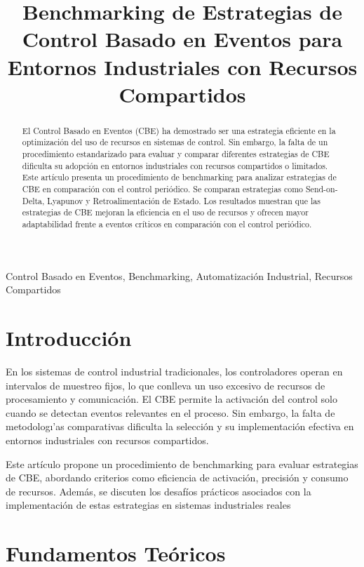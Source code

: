 \documentclass[conference]{IEEEtran}
\title{Benchmarking de Estrategias de Control Basado en Eventos para Entornos Industriales con Recursos Compartidos}
\author{\IEEEauthorblockN{Cristhian Joel Apaza Flores}
\IEEEauthorblockA{Facultad de Ingenier\'ia, Universidad Mayor de San Andr\'es\\
Email: cjapaza11@umsa.bo}}
\begin{document}
\maketitle

\begin{abstract}
El Control Basado en Eventos (CBE) ha demostrado ser una estrategia eficiente en la optimizaci\'on del uso de recursos en sistemas de control. Sin embargo, la falta de un procedimiento estandarizado para evaluar y comparar diferentes estrategias de CBE dificulta su adopci\'on en entornos industriales con recursos compartidos o limitados. Este art\'iculo presenta un procedimiento de benchmarking para analizar estrategias de CBE en comparaci\'on con el control peri\'odico. Se comparan estrategias como Send-on-Delta, Lyapunov y Retroalimentaci\'on de Estado. Los resultados muestran que las estrategias de CBE mejoran la eficiencia en el uso de recursos y ofrecen mayor adaptabilidad frente a eventos cr\'iticos en comparaci\'on con el control peri\'odico.
\end{abstract}

\begin{IEEEkeywords}
Control Basado en Eventos, Benchmarking, Automatizaci\'on Industrial, Recursos Compartidos
\end{IEEEkeywords}

\section{Introducción}
En los sistemas de control industrial tradicionales, los controladores operan en intervalos de muestreo fijos, lo que conlleva un uso excesivo de recursos de procesamiento y comunicaci\'on. El CBE permite la activaci\'on del control solo cuando se detectan eventos relevantes en el proceso\cite{Arzen1999, Astrom2008}. Sin embargo, la falta de metodolog\i'as comparativas dificulta la selecci\'on y su implementación efectiva en entornos industriales con recursos compartidos. 

Este artículo propone un procedimiento de benchmarking para evaluar estrategias de CBE, abordando criterios como eficiencia de activaci\'on, precisi\'on y consumo de recursos. Además, se discuten los desafíos prácticos asociados con la implementación de estas estrategias en sistemas industriales reales

\section{Fundamentos Teóricos}
\end{document}
